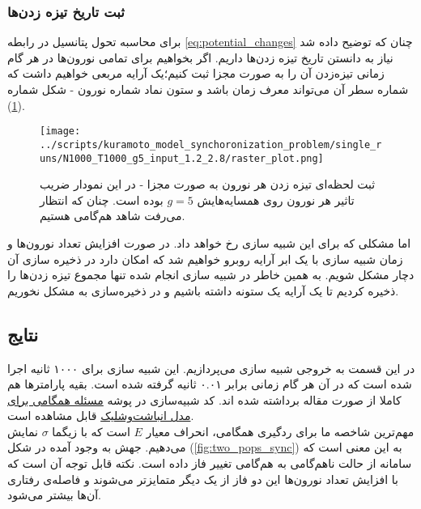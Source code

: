 \documentclass[12pt,onecolumn,a4paper]{article}
\begin{document}
\subsubsection{ثبت تاریخ تیزه زدن‌ها}
برای محاسبه تحول پتانسیل در رابطه \ref{eq:potential_changes} چنان که توضیح داده شد نیاز به دانستن تاریخ تیزه زدن‌ها داریم. اگر بخواهیم برای تمامی نورون‌ها در هر گام زمانی تیزه‌زدن آن را به صورت مجزا ثبت کنیم؛یک آرایه مربعی خواهیم داشت که شماره سطر آن می‌تواند معرف زمان باشد و ستون نماد شماره نورون - شکل شماره (\ref{fig:rasterplot}).\\
\begin{figure}
\centering
  \texttt{[image: ../scripts/kuramoto\_model\_synchoronization\_problem/single\_runs/N1000\_T1000\_g5\_input\_1.2\_2.8/raster\_plot.png]}
 \caption{ثبت لحظه‌ای تیزه زدن هر نورون به صورت مجزا - در این نمودار ضریب تاثیر هر نورون روی همسایه‌هایش $g = 5$ بوده است. چنان که انتظار می‌رفت شاهد هم‌گامی هستیم.}
  \label{fig:rasterplot}
\end{figure}
اما مشکلی که برای این شبیه سازی رخ خواهد داد. در صورت افزایش تعداد نورون‌ها و زمان شبیه سازی با یک ابر آرایه روبرو خواهیم شد که امکان دارد در ذخیره سازی آن دچار مشکل شویم. به همین خاطر در شبیه سازی انجام شده تنها مجموع تیزه زدن‌ها را ذخیره کردیم تا یک آرایه یک ستونه داشته باشیم و در ذخیره‌سازی به مشکل نخوریم.

\subsection{نتایج}
در این قسمت به خروجی شبیه سازی می‌پردازیم. این شبیه سازی برای ۱۰۰۰ ثانیه اجرا شده است که در آن هر گام زمانی برابر ۰.۰۱ ثانیه گرفته شده است. بقیه پارامترها هم کاملا از صورت مقاله برداشته شده اند. کد شبیه‌سازی در پوشه 
\href{run://..//scripts//kuramoto_model_synchoronization_problem}{مسئله همگامی برای مدل انباشت‌و‌شلیک}
قابل مشاهده است.\\
مهم‌ترین شاخصه ما برای ردگیری همگامی، انحراف معیار $E$ است که با زیگما $\sigma$ نمایش می‌دهیم. جهش به وجود آمده در شکل‌ (\ref{fig:two_pops_sync}) به این معنی است که سامانه از حالت ناهم‌گامی به هم‌گامی تغییر فاز داده است. نکته قابل توجه آن است که با افزایش تعداد نورون‌ها این دو فاز از یک دیگر متمایزتر می‌شوند و فاصله‌ی رفتاری آن‌ها بیشتر می‌شود.

\end{document}
